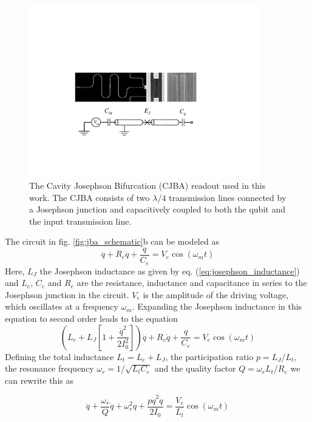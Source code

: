 \begin{figure}
	\includegraphics[width=10cm]{"./material/figures/introduction/jba"}
	\caption{The Cavity Josephson Bifurcation (CJBA) readout used in this work. The CJBA consists of two $\lambda/4$ transmission lines connected by a Josephson junction and capacitively coupled to both the qubit and the input transmission line.}
	\label{fig:cba_schematic}
\end{figure}

The circuit in fig. \ref{fig:jba_schematic}b can be modeled as
%
\begin{equation}
[L_e+L_J (i)]\ddot{q}+R_e \dot{q}+\frac{q}{C_e} = V_e \cos{\left(\omega_m t\right)}
\end{equation}
%
Here, $L_J$ the Josephson inductance as given by eq. (\ref{eq:josephson_inductance}) and $L_e$, $C_e$ and $R_e$ are the resistance, inductance and capacitance in series to the Josephson junction in the circuit. $V_e$ is the amplitude of the driving voltage, which oscillates at a frequency $\omega_m$. Expanding the Josephson inductance in this equation to second order leads to the equation
%
\begin{equation}
\left(L_e+L_J\left[1+\frac{\dot{q}^2}{2 I_0^2}\right]\right)\ddot{q}+R_e \dot{q}+\frac{q}{C_e} = V_e \cos{\left( \omega_m t\right)}
\end{equation}
%
Defining the total inductance $L_t = L_e+L_J$, the participation ratio $p=L_J/L_t$, the resonance frequency $\omega_r = 1/\sqrt{L_t C_e}$ and the quality factor $Q = \omega_r L_t / R_e$ we can rewrite this as

\begin{equation}
\ddot{q}+\frac{\omega_r}{Q}\dot{q}+\omega_r^2 q + \frac{p \dot{q}^2 \ddot{q}}{2 I_0} = \frac{V_e}{L_t}\cos{\left(\omega_m t \right)}
\end{equation}

